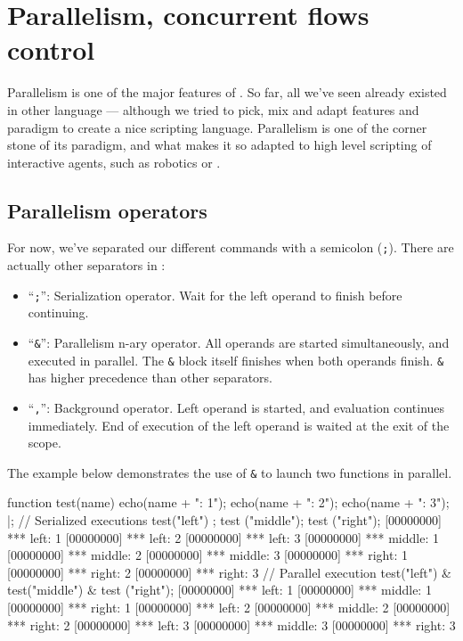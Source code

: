 \chapter{Parallelism, concurrent flows control}
\label{sec:tut:concurrent}

Parallelism is one of the major features of \us. So far, all we've
seen already existed in other language --- although we tried to pick,
mix and adapt features and paradigm to create a nice scripting
language. Parallelism is one of the corner stone of its paradigm, and
what makes it so adapted to high level scripting of interactive
agents, such as robotics or \ai.

\section{Parallelism operators}

For now, we've separated our different commands with a semicolon
(\lstinline{;}). There are actually other separators in \us:

\begin{itemize}
\item ``\lstinline{;}'': Serialization operator. Wait for the left
  operand to finish before continuing.
\item ``\lstinline{&}'': Parallelism n-ary operator. All operands are
  started simultaneously, and executed in parallel. The \lstinline{&}
  block itself finishes when both operands finish. \lstinline{&} has
  higher precedence than other separators.
\item ``\lstinline{,}'': Background operator. Left operand is started,
  and evaluation continues immediately. End of execution of the left
  operand is waited at the exit of the scope.
\end{itemize}

The example below demonstrates the use of \lstinline{&} to launch two
functions in parallel.

\begin{urbiscript}
function test(name)
{
  echo(name + ": 1");
  echo(name + ": 2");
  echo(name + ": 3");
} |;
// Serialized executions
test("left") ; test ("middle"); test ("right");
[00000000] *** left: 1
[00000000] *** left: 2
[00000000] *** left: 3
[00000000] *** middle: 1
[00000000] *** middle: 2
[00000000] *** middle: 3
[00000000] *** right: 1
[00000000] *** right: 2
[00000000] *** right: 3
// Parallel execution
test("left") & test("middle") & test ("right");
[00000000] *** left: 1
[00000000] *** middle: 1
[00000000] *** right: 1
[00000000] *** left: 2
[00000000] *** middle: 2
[00000000] *** right: 2
[00000000] *** left: 3
[00000000] *** middle: 3
[00000000] *** right: 3
\end{urbiscript}

